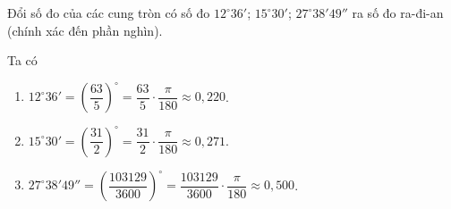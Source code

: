 \begin{bt}%

	Đổi số đo của các cung tròn có số đo $12^\circ 36'$; $15^\circ 30'$; $27^\circ 38'49''$ ra số đo ra-đi-an (chính xác đến phần nghìn).
	\loigiai
	{
		Ta có
		\begin{enumerate}[$\circ$]
			\item $12^\circ 36' = \left(\dfrac{63}{5}\right)^\circ = \dfrac{63}{5}\cdot \dfrac{\pi}{180} \approx 0{,}220$.
			\item $15^\circ 30' = \left(\dfrac{31}{2}\right)^\circ = \dfrac{31}{2}\cdot \dfrac{\pi}{180} \approx 0{,}271$.
			\item $27^\circ 38'49'' = \left(\dfrac{103129}{3600}\right)^\circ = \dfrac{103129}{3600}\cdot \dfrac{\pi}{180} \approx 0{,}500$.
		\end{enumerate}
	}
\end{bt}

